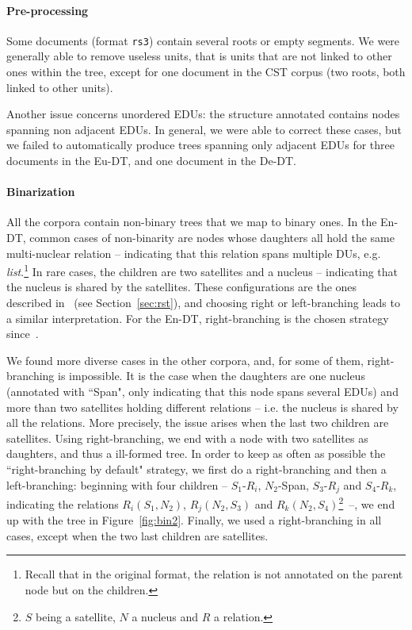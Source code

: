 \documentclass[11pt]{article}
\newcommand{\erstdt}{En-DT}
\newcommand{\derst}{De-DT}
\newcommand{\barst}{Eu-DT}
\newcommand{\rel}[1]{\textit{#1}}
\begin{document}
\paragraph{Pre-processing} Some documents (format \texttt{rs3}) contain several roots or empty segments. 
We were generally able to remove useless units, that is units that are not linked to other ones within the tree, except for one document in the CST corpus (two roots, both linked to other units). 

Another issue concerns unordered EDUs: the structure annotated contains nodes spanning non adjacent EDUs. 
In general, we were able to correct these cases, but we failed to automatically produce trees spanning only adjacent EDUs for three documents in the \barst, and one document in the \derst.



\paragraph{Binarization} All the corpora contain non-binary trees that we map to binary ones.
In the \erstdt, common cases of non-binarity are nodes whose daughters all hold  the same multi-nuclear relation  -- indicating that this relation spans multiple DUs, e.g. \rel{list}.\footnote{Recall that in the original format, the relation is not annotated on the parent node but on the children.}
In rare cases, the children are two satellites and a nucleus -- indicating that the nucleus is shared by the satellites. 
These configurations are the ones described in~\cite{marcu:discourse:1997} (see Section~\ref{sec:rst}), and choosing right or left-branching leads to a similar interpretation.
For the \erstdt, right-branching is the chosen strategy since~\cite{soricut:sentence:2003}.

We found more diverse cases in the other corpora, and, for some of them, right-branching is impossible. 
It is the case when the daughters are one nucleus (annotated with ``Span", only indicating that this node spans several EDUs) and more than two satellites holding different relations -- i.e. the nucleus is shared by all the relations. 
More precisely, the issue arises when the last two children are satellites.
Using right-branching, we end with a node with two satellites as daughters, and thus a ill-formed tree.
In order to keep as often as possible the ``right-branching by default" strategy, we first do a right-branching and then a left-branching: beginning with four children -- $S_1$-$R_i$, $N_2$-Span, $S_3$-$R_j$ and $S_4$-$R_k$, indicating the relations $R_i(S_1,N_2)$, $R_j(N_2,S_3)$ and $R_k(N_2,S_4)$\footnote{$S$ being a satellite, $N$ a nucleus and $R$ a relation.}~--, we end up with the tree in Figure~\ref{fig:bin2}. 
Finally, we used a right-branching in all cases, except when the two last children are satellites.
\end{document}
